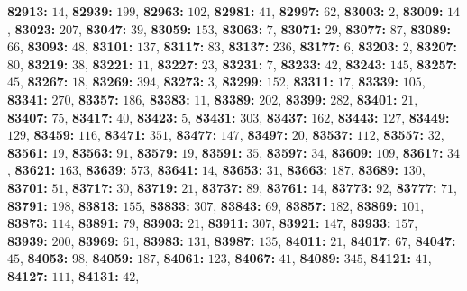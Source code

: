 \textsf{\bfseries 82913:} $14$, \textsf{\bfseries 82939:} $199$, \textsf{\bfseries 82963:} $102$, \textsf{\bfseries 82981:} $41$, \textsf{\bfseries 82997:} $62$, \textsf{\bfseries 83003:} $2$, \textsf{\bfseries 83009:} $14$, \textsf{\bfseries 83023:} $207$, \textsf{\bfseries 83047:} $39$, \textsf{\bfseries 83059:} $153$, \textsf{\bfseries 83063:} $7$, \textsf{\bfseries 83071:} $29$, \textsf{\bfseries 83077:} $87$, \textsf{\bfseries 83089:} $66$, \textsf{\bfseries 83093:} $48$, \textsf{\bfseries 83101:} $137$, \textsf{\bfseries 83117:} $83$, \textsf{\bfseries 83137:} $236$, \textsf{\bfseries 83177:} $6$, \textsf{\bfseries 83203:} $2$, \textsf{\bfseries 83207:} $80$, \textsf{\bfseries 83219:} $38$, \textsf{\bfseries 83221:} $11$, \textsf{\bfseries 83227:} $23$, \textsf{\bfseries 83231:} $7$, \textsf{\bfseries 83233:} $42$, \textsf{\bfseries 83243:} $145$, \textsf{\bfseries 83257:} $45$, \textsf{\bfseries 83267:} $18$, \textsf{\bfseries 83269:} $394$, \textsf{\bfseries 83273:} $3$, \textsf{\bfseries 83299:} $152$, \textsf{\bfseries 83311:} $17$, \textsf{\bfseries 83339:} $105$, \textsf{\bfseries 83341:} $270$, \textsf{\bfseries 83357:} $186$, \textsf{\bfseries 83383:} $11$, \textsf{\bfseries 83389:} $202$, \textsf{\bfseries 83399:} $282$, \textsf{\bfseries 83401:} $21$, \textsf{\bfseries 83407:} $75$, \textsf{\bfseries 83417:} $40$, \textsf{\bfseries 83423:} $5$, \textsf{\bfseries 83431:} $303$, \textsf{\bfseries 83437:} $162$, \textsf{\bfseries 83443:} $127$, \textsf{\bfseries 83449:} $129$, \textsf{\bfseries 83459:} $116$, \textsf{\bfseries 83471:} $351$, \textsf{\bfseries 83477:} $147$, \textsf{\bfseries 83497:} $20$, \textsf{\bfseries 83537:} $112$, \textsf{\bfseries 83557:} $32$, \textsf{\bfseries 83561:} $19$, \textsf{\bfseries 83563:} $91$, \textsf{\bfseries 83579:} $19$, \textsf{\bfseries 83591:} $35$, \textsf{\bfseries 83597:} $34$, \textsf{\bfseries 83609:} $109$, \textsf{\bfseries 83617:} $34$, \textsf{\bfseries 83621:} $163$, \textsf{\bfseries 83639:} $573$, \textsf{\bfseries 83641:} $14$, \textsf{\bfseries 83653:} $31$, \textsf{\bfseries 83663:} $187$, \textsf{\bfseries 83689:} $130$, \textsf{\bfseries 83701:} $51$, \textsf{\bfseries 83717:} $30$, \textsf{\bfseries 83719:} $21$, \textsf{\bfseries 83737:} $89$, \textsf{\bfseries 83761:} $14$, \textsf{\bfseries 83773:} $92$, \textsf{\bfseries 83777:} $71$, \textsf{\bfseries 83791:} $198$, \textsf{\bfseries 83813:} $155$, \textsf{\bfseries 83833:} $307$, \textsf{\bfseries 83843:} $69$, \textsf{\bfseries 83857:} $182$, \textsf{\bfseries 83869:} $101$, \textsf{\bfseries 83873:} $114$, \textsf{\bfseries 83891:} $79$, \textsf{\bfseries 83903:} $21$, \textsf{\bfseries 83911:} $307$, \textsf{\bfseries 83921:} $147$, \textsf{\bfseries 83933:} $157$, \textsf{\bfseries 83939:} $200$, \textsf{\bfseries 83969:} $61$, \textsf{\bfseries 83983:} $131$, \textsf{\bfseries 83987:} $135$, \textsf{\bfseries 84011:} $21$, \textsf{\bfseries 84017:} $67$, \textsf{\bfseries 84047:} $45$, \textsf{\bfseries 84053:} $98$, \textsf{\bfseries 84059:} $187$, \textsf{\bfseries 84061:} $123$, \textsf{\bfseries 84067:} $41$, \textsf{\bfseries 84089:} $345$, \textsf{\bfseries 84121:} $41$, \textsf{\bfseries 84127:} $111$, \textsf{\bfseries 84131:} $42$, 
